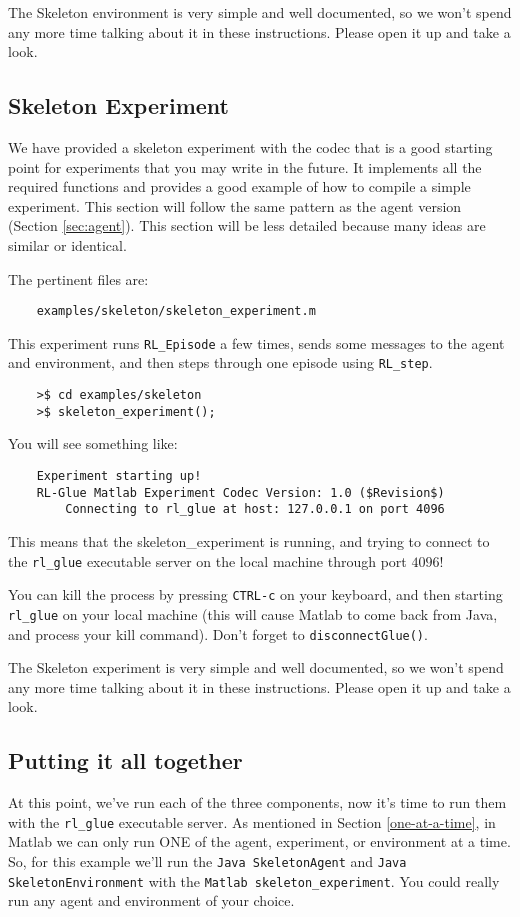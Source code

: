 \documentclass[11pt]{article}
\begin{document}
The Skeleton environment is very simple and well documented, so we won't spend any more time talking about it in these instructions.
Please open it up and take a look.


\subsection{Skeleton Experiment}
We have provided a skeleton experiment with the codec that is a good starting point for experiments that you may write in the future.
It implements all the required functions and provides a good example of how to compile a simple experiment.  This section will follow the same 
pattern as the agent version (Section \ref{sec:agent}).  This section will be less detailed because many ideas are similar or identical.

The pertinent files are:
\begin{verbatim}
	examples/skeleton/skeleton_experiment.m
\end{verbatim}

This experiment runs \texttt{RL\_Episode} a few times, sends some messages to the agent and environment, and then steps through one episode using \texttt{RL\_step}.

\begin{verbatim}
	>$ cd examples/skeleton
	>$ skeleton_experiment();
\end{verbatim}

You will see something like:
\begin{verbatim}
	Experiment starting up!
	RL-Glue Matlab Experiment Codec Version: 1.0 ($Revision$)
	    Connecting to rl_glue at host: 127.0.0.1 on port 4096
\end{verbatim}

This means that the skeleton\_experiment is running, and trying to connect to the \texttt{rl\_glue} executable server on the local machine through port $4096$!  

You can kill the process by pressing \texttt{CTRL-c} on your keyboard, and then starting  \texttt{rl\_glue} on your local machine (this will cause Matlab to come back from Java, and 
process your kill command).  Don't forget to \texttt{disconnectGlue()}.

The Skeleton experiment is very simple and well documented, so we won't spend any more time talking about it in these instructions.
Please open it up and take a look.

\subsection{Putting it all together}
At this point, we've run each of the three components, now it's time to run them with the \texttt{rl\_glue} executable server.  As mentioned in Section \ref{one-at-a-time}, in Matlab we can 
only run ONE of the agent, experiment, or environment at a time.  So, for this example we'll run the \texttt{Java SkeletonAgent} and \texttt{Java SkeletonEnvironment} with the \texttt{Matlab skeleton\_experiment}.  You could really run any agent and environment of your choice.
\end{document}
